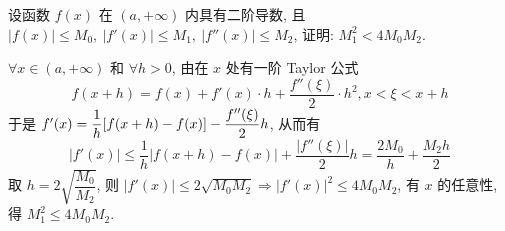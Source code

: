 \begin{example}
    设函数 $f(x)$ 在 $(a,+\infty)$ 内具有二阶导数, 且 $|f(x)|\leqslant M_0,~|f'(x)|\leqslant M_1,~|f''(x)|\leqslant M_2$, 证明: $M_1^2< 4M_0M_2.$
\end{example}
\begin{solution}
    $\forall x\in(a,+\infty)$ 和 $\forall h>0$, 由在 $x$ 处有一阶 Taylor 公式 $$f(x+h)=f(x)+f'(x)\cdot h+\dfrac{f''(\xi)}{2}\cdot h^2,x<\xi<x+h$$
    于是 $f'(x)=\dfrac{1}{h}\qty[f(x+h)-f(x)]-\dfrac{f''(\xi)}{2}h$, 从而有 $$|f'(x)|\leqslant \dfrac{1}{h}|f(x+h)-f(x)|+\dfrac{|f''(\xi)|}{2}h=\dfrac{2M_0}{h}+\dfrac{M_2h}{2}$$
    取 $h=2\sqrt{\dfrac{M_0}{M_2}}$, 则 $|f'(x)|\leqslant 2\sqrt{M_0M_2}\Rightarrow |f'(x)|^2\leqslant 4M_0M_2$, 有 $x$ 的任意性, 得 $M_1^2\leqslant 4M_0M_2.$
\end{solution}

